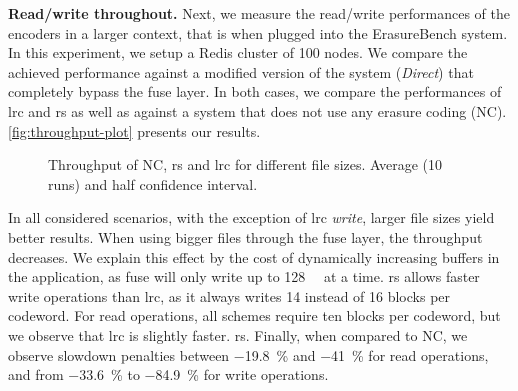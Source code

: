 \textbf{Read/write throughout.}
Next, we measure the read/write performances of the encoders in a larger context, that is when plugged into the ErasureBench system.
In this experiment, we setup a Redis cluster of 100 nodes.
We compare the achieved performance against a modified version of the system (\textit{Direct}) that completely bypass the \ac{fuse} layer.
In both cases, we compare the performances of \ac{lrc} and \ac{rs} as well as against a system that does not use any erasure coding (NC).  
\autoref{fig:throughput-plot} presents our results.
\begin{figure*}[t]
    \centering
    
    \caption{Throughput of NC, \ac{rs} and \ac{lrc} for different file sizes. Average (10 runs) and half confidence interval.}
    \label{fig:throughput-plot}
\end{figure*}
In all considered scenarios, with the exception of \ac{lrc} \textit{write}, larger file sizes yield better results.
When using bigger files through the \ac{fuse} layer, the throughput decreases.
We explain this effect by the cost of dynamically increasing buffers in the application, as \ac{fuse} will only write up to \SI{128}{\kibi\byte} at a time.
\ac{rs} allows faster write operations than \ac{lrc}, as it always writes 14 instead of 16 blocks per codeword.
For read operations, all schemes require ten blocks per codeword, but we observe that \ac{lrc} is slightly faster. \ac{rs}. 
Finally, when compared to NC, we observe slowdown penalties between \SI{-19.8}{\percent} and \SI{-41}{\percent} for read operations, and from \SI{-33.6}{\percent} to \SI{-84.9}{\percent} for write operations.


